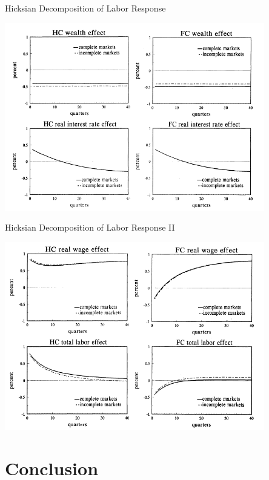 \documentclass[10pt]{beamer}
\begin{document}
\begin{frame}{Hicksian Decomposition of Labor Response}
\centerline{\includegraphics[width=0.85\textwidth]{u4.png}}
\end{frame}

\begin{frame}{Hicksian Decomposition of Labor Response II}
\centerline{\includegraphics[width=0.85\textwidth]{u5.png}}
\end{frame}


\section{Conclusion}
\end{document}
